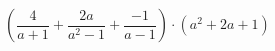 \begin{ex}
	\begin{condition}
		\( \left( \dfrac{4}{a+1}+\dfrac{2a}{a^2-1}+\dfrac{-1}{a-1} \right)\cdot(a^2+2a+1) \)
	\end{condition}
\end{ex}